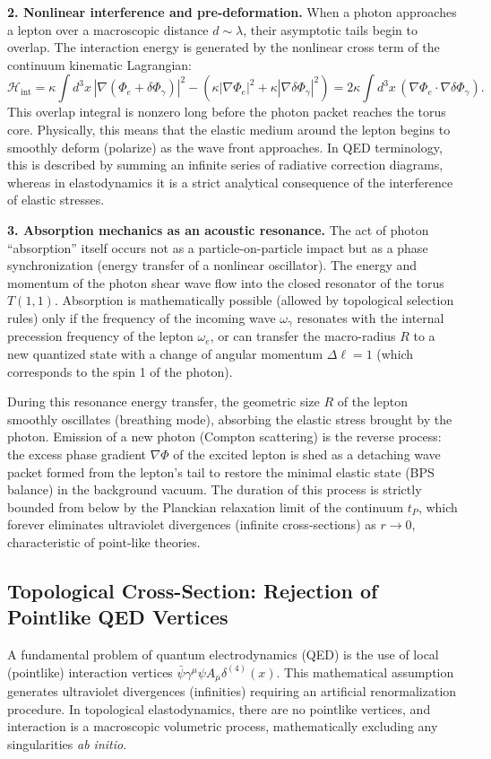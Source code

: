 \documentclass[11pt,a4paper]{article}
\begin{document}
\textbf{2. Nonlinear interference and pre-deformation.}
When a photon approaches a lepton over a macroscopic distance $d \sim \lambda$, their asymptotic tails begin to overlap. The interaction energy is generated by the nonlinear cross term of the continuum kinematic Lagrangian:
\begin{equation}
\mathcal{H}_{\text{int}} = \kappa \int d^3x \, \left| \nabla (\Phi_e + \delta \Phi_\gamma) \right|^2 - \left( \kappa |\nabla \Phi_e|^2 + \kappa |\nabla \delta \Phi_\gamma|^2 \right) = 2\kappa \int d^3x \, (\nabla \Phi_e \cdot \nabla \delta \Phi_\gamma).
\end{equation}
This overlap integral is nonzero long before the photon packet reaches the torus core. Physically, this means that the elastic medium around the lepton begins to smoothly deform (polarize) as the wave front approaches. In QED terminology, this is described by summing an infinite series of radiative correction diagrams, whereas in elastodynamics it is a strict analytical consequence of the interference of elastic stresses.

\textbf{3. Absorption mechanics as an acoustic resonance.}
The act of photon ``absorption'' itself occurs not as a particle-on-particle impact but as a phase synchronization (energy transfer of a nonlinear oscillator). The energy and momentum of the photon shear wave flow into the closed resonator of the torus $T(1,1)$.
Absorption is mathematically possible (allowed by topological selection rules) only if the frequency of the incoming wave $\omega_\gamma$ resonates with the internal precession frequency of the lepton $\omega_e$, or can transfer the macro-radius $R$ to a new quantized state with a change of angular momentum $\Delta \ell = 1$ (which corresponds to the spin 1 of the photon).

During this resonance energy transfer, the geometric size $R$ of the lepton smoothly oscillates (breathing mode), absorbing the elastic stress brought by the photon. Emission of a new photon (Compton scattering) is the reverse process: the excess phase gradient $\nabla \Phi$ of the excited lepton is shed as a detaching wave packet formed from the lepton's tail to restore the minimal elastic state (BPS balance) in the background vacuum. The duration of this process is strictly bounded from below by the Planckian relaxation limit of the continuum $t_P$, which forever eliminates ultraviolet divergences (infinite cross-sections) as $r \to 0$, characteristic of point-like theories.

\subsection{Topological Cross-Section: Rejection of Pointlike QED Vertices}
A fundamental problem of quantum electrodynamics (QED) is the use of local (pointlike) interaction vertices $\bar{\psi}\gamma^\mu\psi A_\mu \delta^{(4)}(x)$. This mathematical assumption generates ultraviolet divergences (infinities) requiring an artificial renormalization procedure. In topological elastodynamics, there are no pointlike vertices, and interaction is a macroscopic volumetric process, mathematically excluding any singularities \textit{ab initio}.
\end{document}
